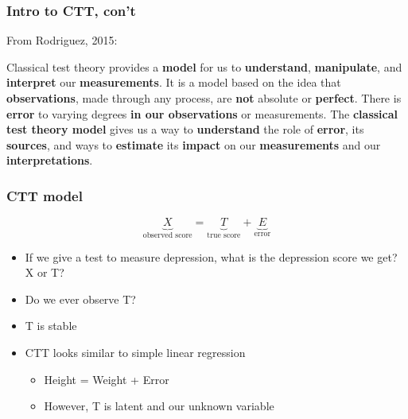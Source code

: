 \documentclass[dvipsnames]{beamer}\usepackage[]{graphicx}\usepackage[]{color}
\begin{document}
\begin{frame}
\frametitle{Intro to CTT, con't}
From Rodriguez, 2015:

\vspace{1cm}
Classical test theory provides a \textbf{model} for us to \textbf{understand}, \textbf{manipulate}, and \textbf{interpret} our \textbf{measurements}.  It is a model based on the idea that \textbf{observations}, made through any process, are \textbf{not} absolute or \textbf{perfect}.  There is \textbf{error} to varying degrees \textbf{in our observations} or measurements.  The \textbf{classical test theory model} gives us a way to \textbf{understand} the role of \textbf{error}, its \textbf{sources}, and ways to \textbf{estimate} its \textbf{impact} on our \textbf{measurements} and our \textbf{interpretations}. 
\end{frame}

\begin{frame}
\frametitle{CTT model}

\begin{center}
$$ \underbrace{X}_{\text{observed score}} = \underbrace{T}_{\text{true score}} + \underbrace{E}_{\text{error}} $$
\end{center}

\begin{itemize}
\item<2-> If we give a test to measure depression, what is the depression score we get? X or T?
\item<3-> Do we ever observe T?
\item<4-> T is stable
\item<5-> CTT looks similar to simple linear regression
  \begin{itemize}
    \item<6-> Height = Weight + Error
    \item<7-> However, T is latent and our unknown variable
  \end{itemize}
\end{itemize}
\end{frame}
\end{document}
